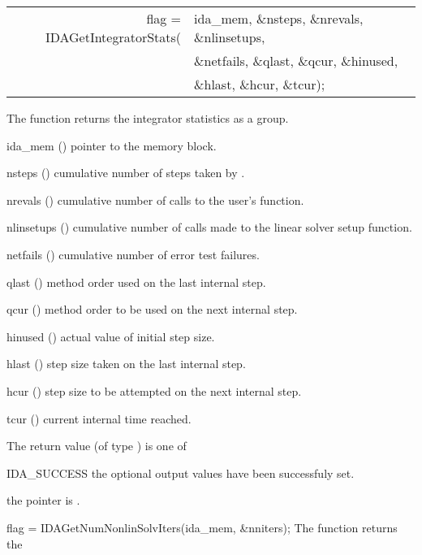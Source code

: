 {{}
{
  \begin{tabular}[t]{@{}r@{}l@{}}
    flag = IDAGetIntegratorStats(&ida\_mem, \&nsteps, \&nrevals, \&nlinsetups, \\
                                 &\&netfails, \&qlast, \&qcur, \&hinused,\\
                                 &\&hlast, \&hcur, \&tcur);
  \end{tabular}
}
{
  The function  returns the {\ida} integrator statistics
  as a group.
}
{
  \begin{args}[nlinsetups]
  \item[ida\_mem] ()
    pointer to the {\ida} memory block.
  \item[nsteps] ()
    cumulative number of steps taken by {\ida}.
  \item[nrevals] ()
    cumulative number of calls to the user's  function.
  \item[nlinsetups] ()
    cumulative number of calls made to the linear solver setup function.
  \item[netfails] ()
    cumulative number of error test failures.
  \item[qlast] ()
    method order used on the last internal step.
  \item[qcur] ()
    method order to be used on the next internal step.
  \item[hinused] ()
    actual value of initial step size.
  \item[hlast] ()
    step size taken on the last internal step.
  \item[hcur] ()
    step size to be attempted on the next internal step.
  \item[tcur] ()
    current internal time reached.
  \end{args}
}
{
  The return value  (of type ) is one of
  \begin{args}
  \item[IDA\_SUCCESS] 
    the optional output values have been successfuly set.
  \item[\Id{IDA\_MEM\_NULL}]
    the  pointer is .
  \end{args}
}
{}
{
  flag = IDAGetNumNonlinSolvIters(ida\_mem, \&nniters);
}
{
  The function  returns the
}}
